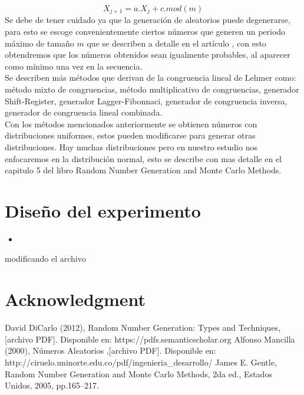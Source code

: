 \documentclass[conference]{IEEEtran}
\begin{document}
\begin{equation}
X_{j+1} = a.X_{j}+c.mod(m)
\end{equation}
Se debe de tener cuidado ya que la generaci\'on de aleatorios puede degenerarse, para esto se escoge convenientemente ciertos n\'umeros que generen un periodo m\'aximo de tama\~no $m$ que se describen a detalle en el art\'iculo \cite{b2}, con esto obtendremos que los n\'umeros obtenidos sean igualmente probables, al aparecer como m\'inimo una vez en la secuencia.\\
Se describen m\'as m\'etodos que derivan de la congruencia lineal de Lehmer como: m\'etodo mixto de congruencias, m\'etodo multiplicativo de congruencias, generador Shift-Register, generador Lagger-Fibonnaci, generador de congruencia inversa, generador de congruencia lineal combinada.\\
Con los m\'etodos mencionados anteriormente se obtienen n\'umeros con distribuciones uniformes, estos pueden modificarse para generar otras distribuciones. Hay muchas distribuciones pero en nuestro estudio nos enfocaremos en la distribuci\'on normal, esto se describe con mas detalle en el capitulo 5 del libro Random Number Generation and Monte Carlo Methods\cite{b3}. 
  
\section{\textbf{Dise\~no del experimento}}
\begin{itemize}

\item 
\end{itemize}

modificando el archivo

\section*{Acknowledgment}



\begin{thebibliography}{00}
 David DiCarlo (2012), Random Number Generation: Types and Techniques, [archivo PDF]. Disponible en: https://pdfs.semanticscholar.org
 Alfonso Mancilla (2000), N\'umeros Aleatorios ,[archivo PDF]. Disponible en: http://ciruelo.uninorte.edu.co/pdf/ingenieria\_desarrollo/
 James E. Gentle, Random Number Generation and Monte Carlo Methods, 2da ed., Estados Unidos, 2005, pp.165--217.

\end{thebibliography}
\vspace{12pt}
\end{document}
